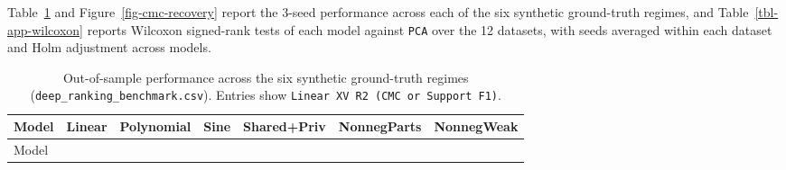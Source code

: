 \documentclass[
  10pt,
  letterpaper,
]{report}
\begin{document}
Table~\ref{tbl-app-synthetic-breakdown} and
Figure~\ref{fig-cmc-recovery} report the 3-seed performance across each
of the six synthetic ground-truth regimes, and
Table~\ref{tbl-app-wilcoxon} reports Wilcoxon signed-rank tests of each
model against \texttt{PCA} over the 12 datasets, with seeds averaged
within each dataset and Holm adjustment across models.

\begin{longtable}[]{@{}
  >{\raggedright\arraybackslash}p{}
  >{\raggedleft\arraybackslash}p{}
  >{\raggedleft\arraybackslash}p{}
  >{\raggedleft\arraybackslash}p{}
  >{\raggedleft\arraybackslash}p{}
  >{\raggedleft\arraybackslash}p{}
  >{\raggedleft\arraybackslash}p{}@{}}
\caption{Out-of-sample performance across the six synthetic ground-truth
regimes (\protect\texttt{deep\_ranking\_benchmark.csv}). Entries show
\protect\texttt{Linear\ XV\ R2\ (CMC\ or\ Support\ F1)}.}\label{tbl-app-synthetic-breakdown}\tabularnewline
\toprule\noalign{}
\begin{minipage}[b]{\linewidth}\raggedright
Model
\end{minipage} & \begin{minipage}[b]{\linewidth}\raggedleft
Linear
\end{minipage} & \begin{minipage}[b]{\linewidth}\raggedleft
Polynomial
\end{minipage} & \begin{minipage}[b]{\linewidth}\raggedleft
Sine
\end{minipage} & \begin{minipage}[b]{\linewidth}\raggedleft
Shared+Priv
\end{minipage} & \begin{minipage}[b]{\linewidth}\raggedleft
NonnegParts
\end{minipage} & \begin{minipage}[b]{\linewidth}\raggedleft
NonnegWeak
\end{minipage} \\
\midrule\noalign{}
\endfirsthead
\toprule\noalign{}
\begin{minipage}[b]{\linewidth}\raggedright
Model
\end{minipage} & \begin{minipage}[b]{\linewidth}\raggedleft

\end{minipage}
\end{longtable}
\end{document}
